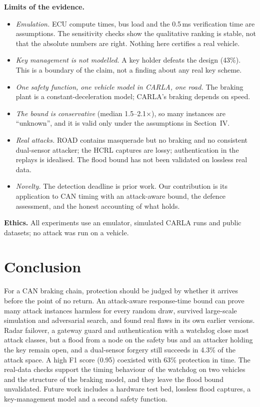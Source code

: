 \documentclass[conference]{IEEEtran}
\begin{document}
\textbf{Limits of the evidence.}
\begin{itemize}
\item \emph{Emulation.} ECU compute times, bus load and the 0.5\,ms verification time are assumptions. The sensitivity checks show the qualitative ranking is stable, not that the absolute numbers are right. Nothing here certifies a real vehicle.
\item \emph{Key management is not modelled.} A key holder defeats the design (43\%). This is a boundary of the claim, not a finding about any real key scheme.
\item \emph{One safety function, one vehicle model in CARLA, one road.} The braking plant is a constant-deceleration model; CARLA's braking depends on speed.
\item \emph{The bound is conservative} (median 1.5--2.1$\times$), so many instances are ``unknown'', and it is valid only under the assumptions in Section~IV.
\item \emph{Real attacks.} ROAD contains masquerade but no braking and no consistent dual-sensor attacker; the HCRL captures are lossy; authentication in the replays is idealised. The flood bound has not been validated on lossless real data.
\item \emph{Novelty.} The detection deadline is prior work. Our contribution is its application to CAN timing with an attack-aware bound, the defence assessment, and the honest accounting of what holds.
\end{itemize}

\textbf{Ethics.} All experiments use an emulator, simulated CARLA runs and public datasets; no attack was run on a vehicle.

\section{Conclusion}
For a CAN braking chain, protection should be judged by whether it arrives before the point of no return. An attack-aware response-time bound can prove many attack instances harmless for every random draw, survived large-scale simulation and adversarial search, and found real flaws in its own earlier versions. Radar failover, a gateway guard and authentication with a watchdog close most attack classes, but a flood from a node on the safety bus and an attacker holding the key remain open, and a dual-sensor forgery still succeeds in 4.3\% of the attack space. A high F1 score (0.95) coexisted with 63\% protection in time. The real-data checks support the timing behaviour of the watchdog on two vehicles and the structure of the braking model, and they leave the flood bound unvalidated. Future work includes a hardware test bed, lossless flood captures, a key-management model and a second safety function.
\end{document}
